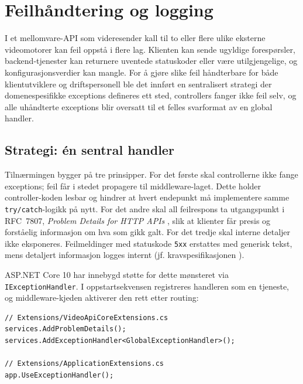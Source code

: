 \section{Feilhåndtering og logging}
\label{sec:errors}

I et mellomvare-API som videresender kall til to eller flere ulike eksterne videomotorer kan feil oppstå i flere lag. Klienten kan sende ugyldige forespørsler, backend-tjenester kan returnere uventede statuskoder eller være utilgjengelige, og konfigurasjonsverdier kan mangle. For å gjøre slike feil håndterbare for både klientutviklere og driftspersonell ble det innført en sentralisert strategi der domenespesifikke exceptions defineres ett sted, controllers fanger ikke feil selv, og alle uhåndterte exceptions blir oversatt til et felles svarformat av en global handler.

\subsection{Strategi: én sentral handler}
\label{subsec:errors-strategi}

Tilnærmingen bygger på tre prinsipper. For det første skal controllerne ikke fange exceptions; feil får i stedet propagere til middleware-laget. Dette holder controller-koden lesbar og hindrer at hvert endepunkt må implementere samme \texttt{try/catch}-logikk på nytt. For det andre skal all feilrespons ta utgangspunkt i RFC~7807, \emph{Problem Details for HTTP APIs} \cite{rfc7807}, slik at klienter får presis og forståelig informasjon om hva som gikk galt. For det tredje skal interne detaljer ikke eksponeres. Feilmeldinger med statuskode \texttt{5xx} erstattes med generisk tekst, mens detaljert informasjon logges internt (jf. kravspesifikasjonen \cite{hdo_kravspec}).

ASP.NET Core 10 har innebygd støtte for dette mønsteret via \texttt{IExceptionHandler}. I oppstartsekvensen registreres handleren som en tjeneste, og middleware-kjeden aktiverer den rett etter routing:

\begin{lstlisting}[language={[Sharp]C}, caption={Registrering av den globale feil-handleren.}, label={lst:register-handler}]
// Extensions/VideoApiCoreExtensions.cs
services.AddProblemDetails();
services.AddExceptionHandler<GlobalExceptionHandler>();

// Extensions/ApplicationExtensions.cs
app.UseExceptionHandler();
\end{lstlisting}


